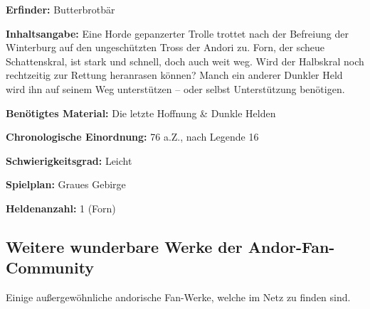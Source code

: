 {

\textbf{Erfinder:} Butterbrotbär


\textbf{Inhaltsangabe:} Eine Horde gepanzerter Trolle trottet nach der Befreiung der Winterburg auf den ungeschützten Tross der Andori zu. Forn, der scheue Schattenskral, ist stark und schnell, doch auch weit weg. Wird der Halbskral noch rechtzeitig zur Rettung heranrasen können? Manch ein anderer Dunkler Held wird ihn auf seinem Weg unterstützen – oder selbst Unterstützung benötigen.

\textbf{Benötigtes Material:} Die letzte Hoffnung \& Dunkle Helden

\textbf{Chronologische Einordnung:} 76 a.Z., nach Legende 16

\textbf{Schwierigkeitsgrad:} Leicht

\textbf{Spielplan:} Graues Gebirge

\textbf{Heldenanzahl:} 1 (Forn)





}










\begin{chapterbox}
    \chapter{Weitere wunderbare Werke der Andor-Fan-Community}
    \label{Weitere wunderbare Werke der Andor-Fan-Community}
    Einige außergewöhnliche andorische Fan-Werke, welche im Netz zu finden sind. 
\end{chapterbox}

\extramarks{}{}

